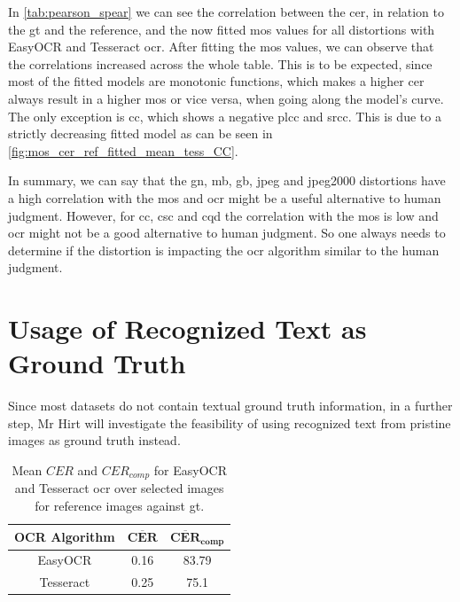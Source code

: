 In \autoref{tab:pearson_spear} we can see the correlation between the \gls{cer}, in relation to the \gls{gt} and the reference, and the now fitted \gls{mos} values for all distortions with EasyOCR and Tesseract \gls{ocr}.
After fitting the \gls{mos} values, we can observe that the correlations increased across the whole table.
This is to be expected, since most of the fitted models are monotonic functions, which makes a higher \gls{cer} always result in a higher \gls{mos} or vice versa, when going along the model's curve.
The only exception is \gls{cc}, which shows a negative \gls{plcc} and \gls{srcc}.
This is due to a strictly decreasing fitted model as can be seen in \autoref{fig:mos_cer_ref_fitted_mean_tess_CC}.

In summary, we can say that the \gls{gn}, \gls{mb}, \gls{gb}, \gls{jpeg} and \gls{jpeg2000} distortions have a high correlation with the \gls{mos} and \gls{ocr} might be a useful alternative to human judgment.
However, for \gls{cc}, \gls{csc} and \gls{cqd} the correlation with the \gls{mos} is low and \gls{ocr} might not be a good alternative to human judgment.
So one always needs to determine if the distortion is impacting the \gls{ocr} algorithm similar to the human judgment.

    
\section{Usage of Recognized Text as Ground Truth}
\label{sec:usage_of_recognized_text_as_ground_truth}

Since most datasets do not contain textual ground truth information,
in a further step, Mr Hirt will investigate the feasibility of
using recognized text from pristine images as ground truth instead.

\begin{table}[h]
\centering
\begin{tabular}{|c|c|c|}
    \hline
    \rule{0em}{1em} \textbf{OCR Algorithm} & $\mathbf{\overline{CER}}$ & $\mathbf{\overline{CER}_{comp}}$ \\
    \hline
    EasyOCR & 0.16 & 83.79 \\
    \hline
    Tesseract & 0.25 & 75.1 \\
    \hline
\end{tabular}
\caption{Mean $CER$ and $CER_{comp}$ for EasyOCR and Tesseract \gls{ocr} over selected images for reference images against \gls{gt}.}
\label{tab:mean_cer_cer_comp}
\end{table}

